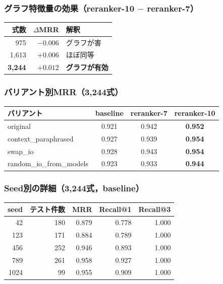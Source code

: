 \documentclass[11pt,a4paper]{ltjsarticle}
\begin{document}
\subsubsection{グラフ特徴量の効果（reranker-10 $-$ reranker-7）}

\begin{table}[h]
\centering
\begin{tabular}{rrl}
\toprule
式数 & $\Delta$MRR & 解釈 \\
\midrule
975 & $-0.006$ & グラフが害 \\
1,613 & $+0.006$ & ほぼ同等 \\
\textbf{3,244} & $\mathbf{+0.012}$ & \textbf{グラフが有効} \\
\bottomrule
\end{tabular}
\end{table}

\subsubsection{バリアント別MRR（3,244式）}

\begin{table}[h]
\centering
\begin{tabular}{lccc}
\toprule
バリアント & baseline & reranker-7 & reranker-10 \\
\midrule
original & 0.921 & 0.942 & \textbf{0.952} \\
context\_paraphrased & 0.927 & 0.939 & \textbf{0.954} \\
swap\_io & 0.928 & 0.943 & \textbf{0.954} \\
random\_io\_from\_models & 0.923 & 0.933 & \textbf{0.944} \\
\bottomrule
\end{tabular}
\end{table}

\subsubsection{Seed別の詳細（3,244式，baseline）}

\begin{table}[h]
\centering
\begin{tabular}{rrrrr}
\toprule
seed & テスト件数 & MRR & Recall@1 & Recall@3 \\
\midrule
42 & 180 & 0.879 & 0.778 & 1.000 \\
123 & 171 & 0.884 & 0.789 & 1.000 \\
456 & 252 & 0.946 & 0.893 & 1.000 \\
789 & 261 & 0.958 & 0.927 & 1.000 \\
1024 & 99 & 0.955 & 0.909 & 1.000 \\
\bottomrule
\end{tabular}
\end{table}
\end{document}
